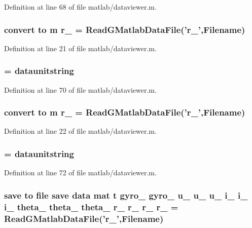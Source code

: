 Definition at line 68 of file matlab/dataviewer.m.
\subsubsection[{r\_\-2}]{\setlength{\rightskip}{0pt plus 5cm}convert to m r\_ = ReadGMatlabDataFile('r\_',{\bf Filename})}\label{matlab_2dataviewer_8m_aebd5e602e2c6cbe7902e50a37467e336}


Definition at line 21 of file matlab/dataviewer.m.
\subsubsection[{r\_\-2\_\-unitstring}]{ = {\bf dataunitstring}}\label{matlab_2dataviewer_8m_a5c03941c5e5f0e70d11a0fa1915d748f}


Definition at line 70 of file matlab/dataviewer.m.
\subsubsection[{r\_\-3}]{\setlength{\rightskip}{0pt plus 5cm}convert to m r\_ = ReadGMatlabDataFile('r\_',{\bf Filename})}\label{matlab_2dataviewer_8m_a1471055915ad3f212e35185bfc74addf}


Definition at line 22 of file matlab/dataviewer.m.
\subsubsection[{r\_\-3\_\-unitstring}]{ = {\bf dataunitstring}}\label{matlab_2dataviewer_8m_ac3b56272e6db658bbfd2bc8245fb00a1}


Definition at line 72 of file matlab/dataviewer.m.
\subsubsection[{r\_\-4}]{\setlength{\rightskip}{0pt plus 5cm}save to file save {\bf data} {\bf mat} {\bf t} {\bf gyro\_} {\bf gyro\_} {\bf u\_} {\bf u\_} {\bf u\_} {\bf i\_} {\bf i\_} {\bf i\_} {\bf theta\_} {\bf theta\_} {\bf theta\_} r\_ r\_ r\_ r\_ = ReadGMatlabDataFile('r\_',{\bf Filename})}\label{matlab_2dataviewer_8m_a9e72e33c2c5326d122899bed345b87c4}


